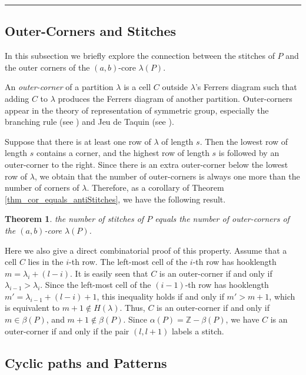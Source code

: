 \documentclass[a4paper,12pt]{article}
\newtheorem{thm}{Theorem}[section]
\newcommand{\qed}{{\hfill\rule{4pt}{7pt}}}
\begin{document}
\qed

%
\subsection{Outer-Corners and Stitches}
In this subsection we briefly explore the connection between the stitches  of $P$ and the outer corners of the $(a,b)$-core $\lambda(P)$.

An \emph{outer-corner} of a partition $\lambda$ is a cell $C$ outside $\lambda$'s Ferrers diagram such that adding $C$ to $\lambda$ produces the Ferrers diagram of another partition.
Outer-corners appear in the theory of representation of symmetric group, especially the branching rule (see \cite{sag}) and Jeu de Taquin (see \cite{EC2}).

Suppose that there is at least one row of $\lambda$ of length $s$. Then the lowest row of length $s$ contains a corner, and the highest row of length $s$ is followed by an outer-corner to the right. Since there is an extra outer-corner below the lowest row of $\lambda$, we obtain that the number of outer-corners is always one more  than the number of corners of $\lambda$.
Therefore, as a corollary of
Theorem \ref{thm_cor_equals_antiStitches}, we have the following result.


\begin{thm}\label{outer}
the  number of stitches of $P$ equals the number of  outer-corners of the $(a,b)$-core $\lambda(P)$.
\end{thm}

Here we also give a direct combinatorial proof of this property. Assume that a cell $C$ lies in the $i$-th row. The left-most cell of the $i$-th row has hooklength $m=\lambda_i+(l-i)$.
It is easily seen that $C$  is an outer-corner if and only if $\lambda_{i-1}>\lambda_i$.
Since the left-most cell of the $(i-1)$-th row has hooklength $m'=\lambda_{i-1}+(l-i)+1$, this inequality holds if and only if $m'>m+1$, which is equivalent to  $m+1\notin H(\lambda)$.
Thus, $C$ is an outer-corner if and only if $m\in \beta(P)$, and $m+1 \notin  \beta(P)$.
Since $\alpha(P)=\mathbb{Z}-\beta(P)$, we have
$C$ is an outer-corner if and only if the pair $(l,l+1)$ labels a stitch.

\subsection{Cyclic paths and Patterns} \label{subsectionCycPathAndPattern}
\end{document}
